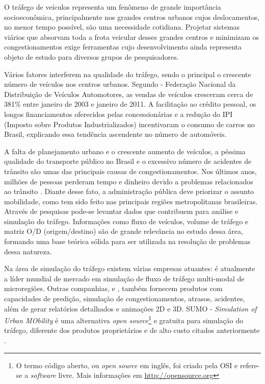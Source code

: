 
O tráfego de veículos representa um fenômeno de grande importância socioeconômica, principalmente nos grandes centros urbanos cujos deslocamentos, no menor tempo possível, são uma necessidade cotidiana. Projetar sistemas viários que absorvam toda a frota veicular desses grandes centros e minimizam os congestionamentos exige ferramentas cujo desenvolvimento ainda representa objeto de estudo para diversos grupos de pesquisadores.

Vários fatores interferem na qualidade do tráfego, sendo o principal o crescente número de veículos nos centros urbanos. Segundo \cite{fenabrave:2013:online} - Federação Nacional da Distribuição de Veículos Automotores, as vendas de veículos cresceram cerca de 381\% entre janeiro de 2003 e janeiro de 2011. A facilitação ao crédito pessoal, os longos financiamentos oferecidos pelas concessionárias e a redução do IPI (Imposto sobre Produtos Industrializados) incentivaram o consumo de carros no Brasil, explicando essa tendência ascendente no número de automóveis.


A falta de planejamento urbano e o crescente aumento de veículos, a péssima qualidade do transporte público no Brasil e o excessivo número de acidentes de trânsito são umas das principais causas de congestionamentos. Nos últimos anos, milhões de pessoas perderam tempo e dinheiro devido a problemas relacionados ao trânsito \citep{pamela:2012:masther}. Diante desse fato, a administração pública deve priorizar o assunto mobilidade, como tem sido feito nas principais regiões metropolitanas brasileiras. Através de pesquisas pode-se levantar dados que contribuem para análise e simulação do tráfego. Informações como fluxo de veículos, volume de tráfego e matriz O/D (origem/destino) são de grande relevância no estudo dessa área, formando uma base teórica sólida para ser utilizada na resolução de problemas dessa natureza.

Na área de simulação do tráfego existem várias empresas atuantes: \cite{vissim:2013:online} é atualmente a líder mundial de mercado em simulação de fluxo de tráfego multi-modal de microregiões. Outras companhias, \cite{arcady:2013:online} e \cite{citilabs:2013:online}, também fornecem produtos com capacidades de predição, simulação de congestionamentos, atrasos, acidentes, além de gerar relatórios detalhados e animações 2D e 3D. SUMO - \textit{Simulation of Urban MObility} é uma alternativa \textit{open source}\footnote{O termo código aberto, ou \textit{open source} em inglês, foi criado pela OSI e refere-se a \textit{software} livre. Mais informações em \url{http://opensource.org}} e gratuita para simulação do tráfego, diferente dos produtos proprietários e de alto custo citados anteriormente \citep{SUMO2011}.

